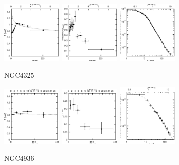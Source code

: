 \documentclass[structabstract]{aa}
\begin{document}
\begin{figure}[h]
   \centering
   \includegraphics[width=0.26\textwidth]{tprofile_ngc4325.eps}
   \includegraphics[width=0.26\textwidth]{zprofile_ngc4325.eps}
   \includegraphics[width=0.26\textwidth]{sbps_ngc4325.eps}
   \caption{NGC4325}
   \label{fig:tprofngc4325}%
\end{figure}
\begin{figure}[h]
   \centering
   \includegraphics[width=0.26\textwidth]{tprofile_ngc4936.eps}
   \includegraphics[width=0.26\textwidth]{zprofile_ngc4936.eps}
   \includegraphics[width=0.26\textwidth]{sbps_ngc4936.eps}
   \caption{NGC4936}
   \label{fig:tprofngc4936}%
\end{figure}
\end{document}
